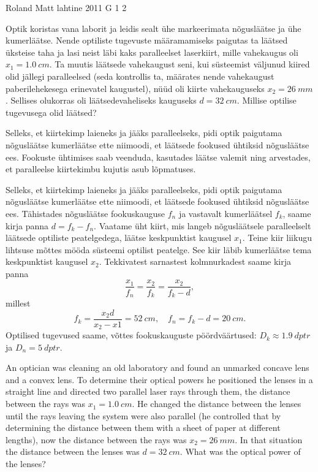 {Roland Matt} %
{lahtine} %
{2011} %
{G 1} %
{2} %
{
\ifStatement
Optik koristas vana laborit ja leidis sealt ühe markeerimata nõgusläätse ja ühe
kumerläätse. Nende optiliste tugevuste määramamiseks paigutas ta läätsed
üksteise taha ja lasi neist läbi kaks paralleelset laserkiirt, mille vahekaugus
oli $x_{1}=\SI{1,0}{cm}$. Ta muutis läätsede vahekaugust seni, kui süsteemist väljunud
kiired olid jällegi paralleelsed (seda kontrollis ta, määrates nende vahekaugust
paberilehekesega erinevatel kaugustel), nüüd oli kiirte vahekauguseks
$x_{2}=\SI{26}{mm}$. Sellises olukorras oli läätsedevaheliseks kauguseks 
$d=\SI{32}{cm}$.
Millise optilise tugevusega olid läätsed?
\fi


\ifHint
Selleks, et kiirtekimp laieneks ja jääks paralleelseks, pidi optik paigutama
nõgusläätse kumerläätse ette niimoodi, et läätsede fookused ühtiksid nõgusläätse
ees. Fookuste ühtimises saab veenduda, kasutades läätse valemit ning arvestades, et paralleelse kiirtekimbu kujutis asub lõpmatuses.
\fi


\ifSolution
Selleks, et kiirtekimp laieneks ja jääks paralleelseks, pidi optik paigutama
nõgusläätse kumerläätse ette niimoodi, et läätsede fookused ühtiksid nõgusläätse
ees. Tähistades nõgusläätse fookuskauguse $f_{n}$ ja vastavalt kumerläätsel
$f_{k}$, saame kirja panna $d=f_{k}-f_{n}$. Vaatame üht kiirt, mis langeb
nõgusläätsele paralleelselt läätsede optiliste peatelgedega, läätse keskpunktist
kaugusel $x_{1}$. Teine kiir liikugu lihtsuse mõttes mööda süsteemi optilist
peatelge. See kiir läbib kumerläätse tema keskpunktist kaugusel $x_{2}$.
Tekkivatest sarnastest kolmnurkadest saame kirja panna
\[ \frac{x_{1}}{f_{n}}=\frac{x_{2}}{f_{k}}=\frac{x_{2}}{f_{k}-d}, \] millest
\[ f_{k}=\frac{x_{2}d}{x_{2}-x{1}}=\SI{52}{cm},\quad f_{n}=f_{k}-d=\SI{20}{cm}.\]
Optilised tugevused saame, võttes fookuskauguste pöördväärtused:
$D_{k}\approx\SI{1,9}{dptr}$ ja $D_{n}=\SI{5}{dptr}$.
\fi


\ifEngStatement
An optician was cleaning an old laboratory and found an unmarked concave lens and a convex lens. To determine their optical powers he positioned the lenses in a straight line and directed two parallel laser rays through them, the distance between the rays was $x_{1}=\SI{1,0}{cm}$. He changed the distance between the lenses until the rays leaving the system were also parallel (he controlled that by determining the distance between them with a sheet of paper at different lengths), now the distance between the rays was $x_{2}=\SI{26}{mm}$. In that situation the distance between the lenses was $d=\SI{32}{cm}$. What was the optical power of the lenses?
\fi


}
